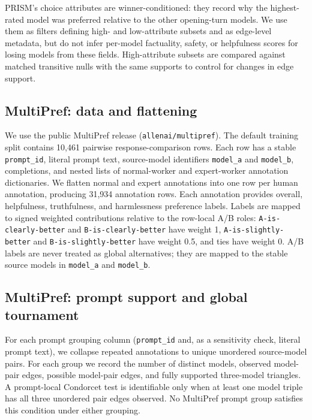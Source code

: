 \documentclass[10pt]{article}
\theoremstyle{definition}
\theoremstyle{remark}
\begin{document}
PRISM's choice attributes are winner-conditioned: they record why the highest-rated model was preferred relative to the other opening-turn models. We use them as filters defining high- and low-attribute subsets and as edge-level metadata, but do not infer per-model factuality, safety, or helpfulness scores for losing models from these fields. High-attribute subsets are compared against matched transitive nulls with the same supports to control for changes in edge support.

\subsection*{MultiPref: data and flattening}

We use the public MultiPref release (\texttt{allenai/multipref})\cite{miranda2025}. The default training split contains 10,461 pairwise response-comparison rows. Each row has a stable \texttt{prompt\_id}, literal prompt text, source-model identifiers \texttt{model\_a} and \texttt{model\_b}, completions, and nested lists of normal-worker and expert-worker annotation dictionaries. We flatten normal and expert annotations into one row per human annotation, producing 31,934 annotation rows. Each annotation provides overall, helpfulness, truthfulness, and harmlessness preference labels. Labels are mapped to signed weighted contributions relative to the row-local A/B roles: \texttt{A-is-clearly-better} and \texttt{B-is-clearly-better} have weight 1, \texttt{A-is-slightly-better} and \texttt{B-is-slightly-better} have weight 0.5, and ties have weight 0. A/B labels are never treated as global alternatives; they are mapped to the stable source models in \texttt{model\_a} and \texttt{model\_b}.

\subsection*{MultiPref: prompt support and global tournament}

For each prompt grouping column (\texttt{prompt\_id} and, as a sensitivity check, literal prompt text), we collapse repeated annotations to unique unordered source-model pairs. For each group we record the number of distinct models, observed model-pair edges, possible model-pair edges, and fully supported three-model triangles. A prompt-local Condorcet test is identifiable only when at least one model triple has all three unordered pair edges observed. No MultiPref prompt group satisfies this condition under either grouping.
\end{document}
